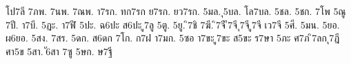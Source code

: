{%
โป7ลี
7ภพ.
7นพ.
7ณพ.
า7รก.
ทก7รก
ย7รก.
ยว7รก.
5มล.
ุ5บล.
โล7บล.
5ชล.
5ชก.
7โพ
5ณู
7ปี.
า7บี.
5ฏะ.
า7ฬี
5ปะ.
ฉ6ปะ
ส6ปะ
ู7ลู
5ตู.
5ยู.
ิ7ชิ
7ฆี.
ิ7จี
ี7จี
ุ7จี
ู7จี
เว7จี
5ศี.
5มน.
5ยอ.
ผ6ยอ.
5สง.
7สร.
5ดก.
ส6ดก
7โก.
ก7ฝ
า7มก.
5ซอ
า7ขะ
ู7ขะ
ส5ขะ
ร7ษา
5ภะ
ศ7ภ
ิ7ลก
ุ7ฎี
ศา5ข
5สา.
ั6สา
7ซู
5ษก.
ษ7ฐี
}
